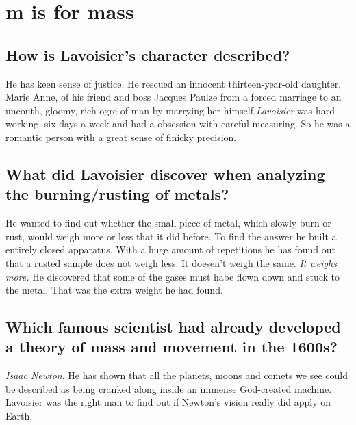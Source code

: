 %

\section{m is for mass}

\subsection*{How is Lavoisier’s character described?}
He has keen sense of justice. He rescued an innocent thirteen-year-old daughter, Marie Anne, of his friend and boss Jacques Paulze from a forced marriage to an uncouth, gloomy, rich ogre of man by marrying her himself.\emph{Lavoisier} was hard working, six days a week and had a obsession with careful measuring. So he was a romantic person with a great sense of finicky precision.


\subsection*{What did Lavoisier discover when analyzing the burning/rusting of metals?}
He wanted to find out whether the small piece of metal, which slowly burn or rust, would weigh more or less that it did before. To find the answer he built a entirely closed apparatus. With a huge amount of repetitions he has found out that  a rusted sample does not weigh less. It doesen't weigh the same. \emph{It weighs more.} He discovered that some of the gases must habe flown down and stuck to the metal. That was the extra weight he had found.

\subsection*{Which famous scientist had already developed a theory of mass and movement in the 1600s?}
\emph{Isaac Newton}. He has shown that all the planets, moons and comets we see could be described as being cranked along inside an immense God-created machine. Lavoisier was the right man to find out if Newton's vision really did apply on Earth.

